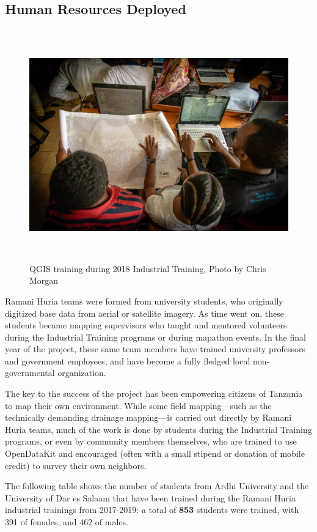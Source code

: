 \documentclass[a4paper,12pt,twoside]{article}
\begin{document}
\subsection{Human Resources Deployed}
\begin{figure}[h!]
	\centering
	\includegraphics[width=\textwidth, height=10cm,keepaspectratio]{images/Map_production.JPG}
	\caption{QGIS training during 2018 Industrial Training, Photo by Chris Morgan}
\end{figure}

\begin{multicols}{2}
Ramani Huria teams were formed from university students, who originally digitized base data from aerial or satellite imagery.  As time went on, these students became mapping  supervisors who taught and mentored volunteers during the Industrial Training programs or during mapathon events. In the final year of the project, these same team members have trained university professors and government employees, and have become a fully fledged local non-governmental organization. 

The key to the success of the project has been empowering citizens of Tanzania to map their own environment. While some field mapping—such as the technically demanding drainage mapping—is carried out directly by Ramani Huria teams, much of the work is done by students during the Industrial Training programs, or even by community members themselves, who are trained to use OpenDataKit and encouraged (often with a small stipend or donation of mobile credit) to survey their own neighbors.

The following table shows the number of students from Ardhi University and the University of Dar es Salaam that have been trained during the Ramani Huria industrial trainings from 2017-2019: a total of \textbf{853} students were trained, with 391 of females, and 462 of males.
\end{multicols}
\end{document}
